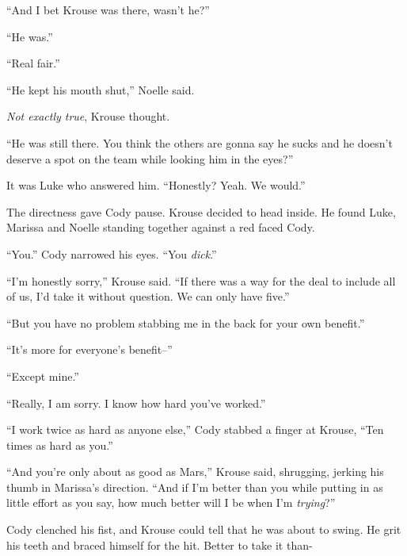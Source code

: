 ``And I bet Krouse was there, wasn't he?''



``He was.''



``Real fair.''



``He kept his mouth shut,'' Noelle said.



\emph{Not exactly true}, Krouse thought.



``He was still there.  You think the others are gonna say he sucks and he doesn't deserve a spot on the team while looking him in the eyes?''



It was Luke who answered him.  ``Honestly?  Yeah.  We would.''



The directness gave Cody pause.  Krouse decided to head inside.  He found Luke, Marissa and Noelle standing together against a red faced Cody.



``You.'' Cody narrowed his eyes.  ``You \emph{dick}.''



``I'm honestly sorry,'' Krouse said.  ``If there was a way for the deal to include all of us, I'd take it without question.  We can only have five.''



``But you have no problem stabbing me in the back for your own benefit.''



``It's more for everyone's benefit--''



``Except mine.''



``Really, I am sorry.  I know how hard you've worked.''



``I work twice as hard as anyone else,'' Cody stabbed a finger at Krouse, ``Ten times as hard as you.''



``And you're only about as good as Mars,'' Krouse said, shrugging, jerking his thumb in Marissa's direction.  ``And if I'm better than you while putting in as little effort as you say, how much better will I be when I'm\emph{ trying}?''



Cody clenched his fist, and Krouse could tell that he was about to swing.  He grit his teeth and braced himself for the hit.  Better to take it than-



